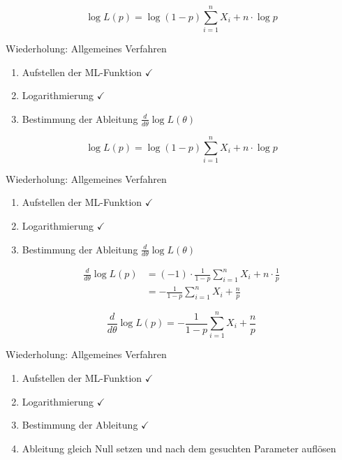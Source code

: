 \documentclass[t,11pt]{beamer}
\begin{document}
\begin{frame}
	$$\log L(p) = \log (1-p) \sum_{i=1}^{n} X_i + n\cdot \log p$$
	\begin{exampleblock}{Wiederholung: Allgemeines Verfahren}
		\begin{enumerate}
			\item Aufstellen der ML-Funktion $\checkmark$ 
			\item Logarithmierung $\checkmark$
			\item Bestimmung der Ableitung $\frac{d}{d\theta}\log L(\theta)$
		\end{enumerate}
	\end{exampleblock}
\end{frame}

\begin{frame}
$$\log L(p) = \log (1-p) \sum_{i=1}^{n} X_i + n\cdot \log p$$
\begin{exampleblock}{Wiederholung: Allgemeines Verfahren}
	\begin{enumerate}
		\item Aufstellen der ML-Funktion $\checkmark$ 
		\item Logarithmierung $\checkmark$
		\item Bestimmung der Ableitung $\frac{d}{d\theta}\log L(\theta)$
	\end{enumerate}
\end{exampleblock}
\begin{align*}
\frac{d}{d\theta}\log L(p) &=  (-1) \cdot \frac{1}{1-p} \sum_{i=1}^{n} X_i + n\cdot \frac{1}{p} \\
&= -\frac{1}{1-p}\sum_{i=1}^{n} X_i +  \frac{n}{p}
\end{align*}
\end{frame}

\begin{frame}
	$$  \frac{d}{d\theta}\log L(p) = -\frac{1}{1-p}\sum_{i=1}^{n} X_i +  \frac{n}{p}$$
	\begin{exampleblock}{Wiederholung: Allgemeines Verfahren}
		\begin{enumerate}
			\item Aufstellen der ML-Funktion $\checkmark$
			\item Logarithmierung $\checkmark$
			\item Bestimmung der Ableitung $\checkmark$
			\item Ableitung gleich Null setzen und nach dem gesuchten Parameter auflösen
		\end{enumerate}
	\end{exampleblock}
\end{frame}
\end{document}
